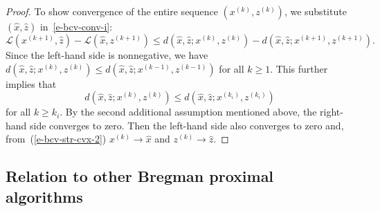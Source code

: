 \documentclass[letterpaper,11pt]{article}
\newcommand{\cL}{\mathcal L}
\begin{document}
\begin{proof}
To show convergence of the entire sequence $(x^{(k)},z^{(k)})$,
we substitute $(\hat x,\hat z)$ in~\eqref{e-bcv-conv-i}:
\[
\cL(x^{(k+1)},\hat z)-\cL(\hat x,z^{(k+1)}) \leq
d(\hat x,\hat z;x^{(k)},z^{(k)})-d(\hat x,\hat z;x^{(k+1)},z^{(k+1)}).
\] 
Since the left-hand side is nonnegative, we have
$d(\hat x,\hat z;x^{(k)},z^{(k)}) \leq 
d(\hat x,\hat z;x^{(k-1)},z^{(k-1)})$
for all $k \geq 1$. This further implies that
\[
d(\hat x,\hat z;x^{(k)},z^{(k)}) \leq 
d(\hat x,\hat z;x^{(k_i)},z^{(k_i)})
\]
for all $k \geq k_i$. By the second additional assumption mentioned above,
the right-hand side converges to zero.
Then the left-hand side also converges to zero and, 
from~(\ref{e-bcv-str-cvx-2})
$x^{(k)} \to \hat x$ and $z^{(k)} \to \hat z$.
\end{proof}

\subsection{Relation to other Bregman proximal algorithms}
\label{s-bcv-connection}
\end{document}
